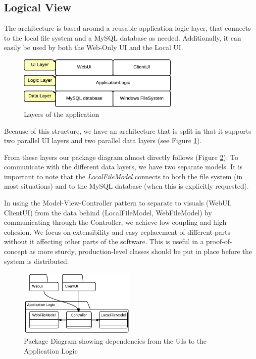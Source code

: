 \subsection{Logical View}

The architecture is based around a reusable application logic layer, that connects to the
local file system and a MySQL database as needed. Additionally, it can easily be used by
both the Web-Only UI and the Local UI.

\begin{figure}[htb]
	\centering
	\includegraphics[width=0.7\textwidth]{Software_architecture/graphics/application-layers.png}
	\caption{Layers of the application}
	\label{fig:application-layers}
\end{figure}

Because of this structure, we have an architecture that is split in that it supports two
parallel UI layers and two parallel data layers (see Figure \ref{fig:application-layers}).

From these layers our package diagram almost directly follows (Figure \ref{fig:package-diagram}):
To communicate with the different data layers, we have two separate models. It is important to
note that the \emph{LocalFileModel} connects to both the file system (in most situations) and
to the MySQL database (when this is explicitly requested).

In using the Model-View-Controller pattern to separate to visuals (WebUI, ClientUI) from the
data behind (LocalFileModel, WebFileModel) by communicating through the Controller, we achieve
low coupling and high cohesion. We focus on extensibility and easy replacement of different
parts without it affecting other parts of the software. This is useful in a proof-of-concept as
more sturdy, production-level classes should be put in place before the system is distributed.

\begin{figure}[htb]
	\centering
	\includegraphics[width=0.5\textwidth]{Software_architecture/graphics/package-diagram.png}
	\caption{Package Diagram showing dependencies from the UIs to the Application Logic}
	\label{fig:package-diagram}
\end{figure}

